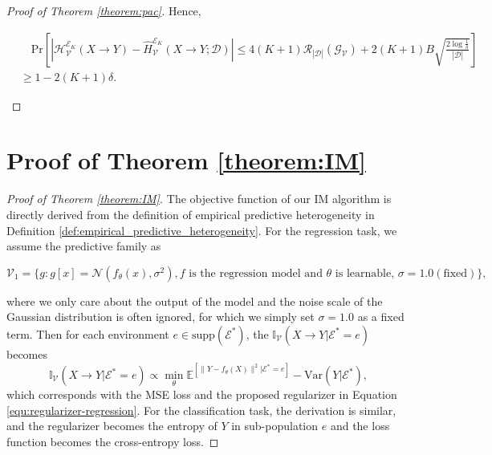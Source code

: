 \begin{proof}[Proof of Theorem \ref{theorem:pac}]
Hence,
\begin{small}
\begin{align}
    &\quad \mathrm{Pr}\left[|\mathcal H_\mathcal V^{\mathscr E_K}(X\rightarrow Y) - \hat{H}_\mathcal V^{\mathscr E_K}(X\rightarrow Y;\mathcal D)| \leq 4(K+1)\mathscr R_{|\mathcal D|}(\mathcal G_{\mathcal V}) + 2(K+1)B\sqrt{\frac{2\log{\frac{1}{\delta}}}{|\mathcal D|}}\right] \\
    &\geq 1 - 2(K+1)\delta.
\end{align}
\end{small}
\end{proof}



\section{Proof of Theorem \ref{theorem:IM}}
\label{proof: IM}
\begin{proof}[Proof of Theorem \ref{theorem:IM}]
    The objective function of our IM algorithm is directly derived from the definition of empirical predictive heterogeneity in Definition \ref{def:empirical_predictive_heterogeneity}.
    For the regression task, we assume the predictive family as 
    \begin{small}
\begin{equation}
	\mathcal{V}_1 = \{g: g[x]=\mathcal{N}(f_{\theta}(x), \sigma^2), f\text{ is the regression model and }\theta\text{ is learnable, }\sigma=1.0 (\text{fixed})\},
\end{equation}	
\end{small}
where we only care about the output of the model and the noise scale of the Gaussian distribution is often ignored, for which we simply set $\sigma=1.0$ as a fixed term.
Then for each environment $e\in\text{supp}(\mathcal{E}^*)$, the $\mathbb{I}_{\mathcal{V}}(X\rightarrow Y|\mathcal{E}^*=e)$ becomes
\begin{equation}
	\mathbb{I}_{\mathcal{V}}(X\rightarrow Y|\mathcal{E}^*=e)\propto \min_\theta \mathbb{E}^[\|Y-f_\theta(X)\|^2|\mathcal{E}^*=e] - \text{Var}(Y|\mathcal{E}^*),
\end{equation}
which corresponds with the MSE loss and the proposed regularizer in Equation \ref{equ:regularizer-regression}.
For the classification task, the derivation is similar, and the regularizer becomes the entropy of $Y$ in sub-population $e$ and the loss function becomes the cross-entropy loss.
\end{proof}















